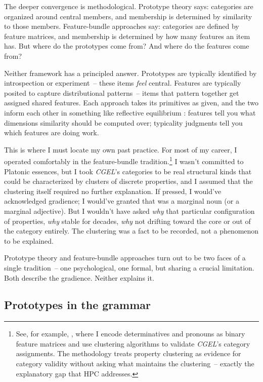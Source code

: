 The deeper convergence is methodological. Prototype theory says: categories are organized around central members, and membership is determined by similarity to those members. Feature-bundle approaches say: categories are defined by feature matrices, and membership is determined by how many features an item has. But where do the prototypes come from? And where do the features come from?

Neither framework has a principled answer. Prototypes are typically identified by introspection or experiment~-- these items \emph{feel} central. Features are typically posited to capture distributional patterns~-- items that pattern together get assigned shared features. Each approach takes its primitives as given, and the two inform each other in something like reflective equilibrium \citep{Goodman1955}: features tell you what dimensions similarity should be computed over; typicality judgments tell you which features are doing work.

This is where I must locate my own past practice. For most of my career, I operated comfortably in the feature-bundle tradition.\footnote{See, for example, \textcite{reynolds2021}, where I encode determinatives and pronouns as binary feature matrices and use clustering algorithms to validate \textit{CGEL}'s category assignments. The methodology treats property clustering as evidence for category validity without asking what maintains the clustering~-- exactly the explanatory gap that HPC addresses.} I wasn't committed to Platonic essences, but I took \textit{CGEL}'s categories to be real structural kinds that could be characterized by clusters of discrete properties, and I assumed that the clustering itself required no further explanation. If pressed, I would've acknowledged gradience; I would've granted that  was a marginal noun (or a marginal adjective). But I wouldn't have asked \emph{why} that particular configuration of properties, \emph{why} stable for decades, \emph{why} not drifting toward the core or out of the category entirely. The clustering was a fact to be recorded, not a phenomenon to be explained.

Prototype theory and feature-bundle approaches turn out to be two faces of a single tradition~-- one psychological, one formal, but sharing a crucial limitation. Both describe the gradience. Neither explains it.

\subsection{Prototypes in the grammar}
\label{sec:1:prototypes-in-grammar}

